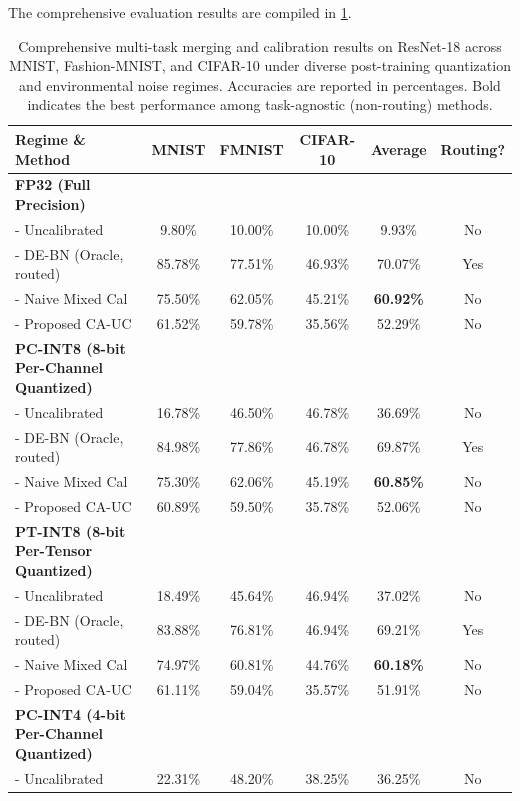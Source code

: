 \documentclass{article}
\theoremstyle{plain}
\theoremstyle{definition}
\theoremstyle{remark}
\begin{document}
The comprehensive evaluation results are compiled in \cref{tab:results}.

\begin{table}[t]
\caption{Comprehensive multi-task merging and calibration results on ResNet-18 across MNIST, Fashion-MNIST, and CIFAR-10 under diverse post-training quantization and environmental noise regimes. Accuracies are reported in percentages. Bold indicates the best performance among task-agnostic (non-routing) methods.}
\label{tab:results}
\vskip 0.1in
\begin{center}
\renewcommand{\arraystretch}{0.70}
\begin{footnotesize}
\begin{tabular}{lccccc}
\toprule
Regime \& Method & MNIST & FMNIST & CIFAR-10 & Average & Routing? \\
\midrule
\textbf{FP32 (Full Precision)} & & & & & \\
- Uncalibrated & 9.80\% & 10.00\% & 10.00\% & 9.93\% & No \\
- DE-BN (Oracle, routed) & 85.78\% & 77.51\% & 46.93\% & 70.07\% & Yes \\
- Naive Mixed Cal & 75.50\% & 62.05\% & 45.21\% & \textbf{60.92\%} & No \\
- Proposed CA-UC & 61.52\% & 59.78\% & 35.56\% & 52.29\% & No \\
\midrule
\textbf{PC-INT8 (8-bit Per-Channel Quantized)} & & & & & \\
- Uncalibrated & 16.78\% & 46.50\% & 46.78\% & 36.69\% & No \\
- DE-BN (Oracle, routed) & 84.98\% & 77.86\% & 46.78\% & 69.87\% & Yes \\
- Naive Mixed Cal & 75.30\% & 62.06\% & 45.19\% & \textbf{60.85\%} & No \\
- Proposed CA-UC & 60.89\% & 59.50\% & 35.78\% & 52.06\% & No \\
\midrule
\textbf{PT-INT8 (8-bit Per-Tensor Quantized)} & & & & & \\
- Uncalibrated & 18.49\% & 45.64\% & 46.94\% & 37.02\% & No \\
- DE-BN (Oracle, routed) & 83.88\% & 76.81\% & 46.94\% & 69.21\% & Yes \\
- Naive Mixed Cal & 74.97\% & 60.81\% & 44.76\% & \textbf{60.18\%} & No \\
- Proposed CA-UC & 61.11\% & 59.04\% & 35.57\% & 51.91\% & No \\
\midrule
\textbf{PC-INT4 (4-bit Per-Channel Quantized)} & & & & & \\
- Uncalibrated & 22.31\% & 48.20\% & 38.25\% & 36.25\% & No \\

\end{tabular}
\end{footnotesize}
\end{center}
\end{table}
\end{document}
